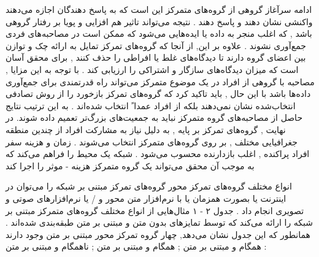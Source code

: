 \documentclass{beamer}
\begin{document}
\begin{persian}
\begin{frame}{ادامه سرآغاز}
گروهی از گروه‌های متمرکز این است که به پاسخ دهندگان اجازه می‌دهند واکنشی نشان دهند و پاسخ دهند . نتیجه می‌تواند تاثیر هم افزایی و پویا بر رفتار گروهی باشد , که اغلب منجر به داده یا ایده‌هایی می‌شود که ممکن است در مصاحبه‌های فردی جمع‌آوری نشوند . علاوه بر این, از آنجا که گروه‌های تمرکز تمایل به ارائه چک و توازن بین اعضای گروه دارند تا دیدگاه‌های غلط یا افراطی را حذف کنند , برای محقق آسان است که میزان دیدگاه‌های سازگار و اشتراکی را ارزیابی کند . با توجه به این مزایا , مصاحبه با گروهی از افراد در یک موضوع متمرکز می‌تواند راه قدرتمندی برای جمع‌آوری داده‌ها باشد با این حال , باید تاکید کرد که گروه‌های تمرکز بازخورد را از روش تصادفی انتخاب‌شده نشان نمی‌دهند بلکه از افراد عمدا ً انتخاب شده‌اند . به این ترتیب  نتایج حاصل از مصاحبه‌های گروه متمرکز نباید به جمعیت‌های بزرگ‌تر تعمیم داده شوند.
 در نهایت , گروه‌های تمرکز بر پایه , به دلیل نیاز به مشارکت افراد از چندین منطقه جغرافیایی مختلف , بر روی گروه‌های متمرکز انتخاب می‌شوند . زمان و هزینه سفر افراد پراکنده , اغلب بازدارنده محسوب می‌شود . شبکه یک محیط را فراهم می‌کند که به موجب آن محقق می‌تواند یک گروه متمرکز هزینه - موثر را اجرا کند 
\end{frame}

\begin{frame}{انواع مختلف گروه‌های تمرکز محور}
گروه‌های تمرکز مبتنی بر شبکه را می‌توان در اینترنت یا بصورت همزمان یا با نرم‌افزار متن محور و / یا نرم‌افزارهای صوتی و تصویری انجام داد . جدول ۲ - ۱ مثال‌هایی از انواع مختلف گروه‌های متمرکز مبتنی بر شبکه را ارائه می‌کند که توسط تمایزهای بدون متن و مبتنی بر متن طبقه‌بندی شده‌اند . همانطور که این جدول نشان می‌دهد, چهار گروه تمرکز محور مبتنی بر متن وجود دارند : همگام و مبتنی بر متن ; همگام و مبتنی بر متن ; ناهمگام و مبتنی بر متن

\end{frame}



\end{persian}
\end{document}
